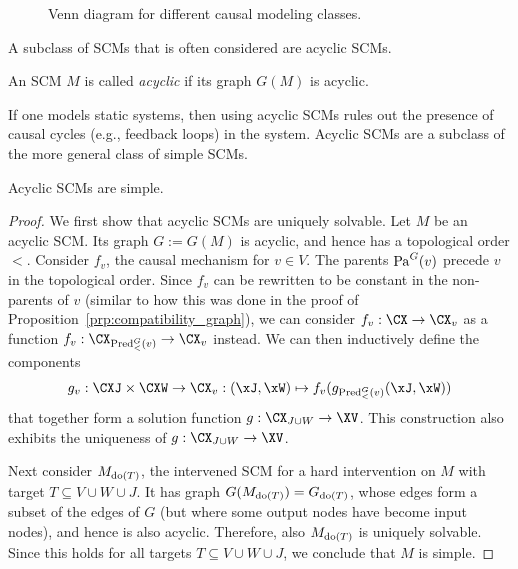 \begin{figure}[t]\centering
  \caption{Venn diagram for different causal modeling classes.\label{fig:venn_diagram_scms}}
\end{figure}
A subclass of SCMs that is often considered are acyclic SCMs.
\begin{Def}\label{def:scm_acyclic}
  An SCM $M$ is called \emph{acyclic} if its graph $G(M)$ is acyclic.
\end{Def}
If one models static systems, then using acyclic SCMs
rules out the presence of causal cycles (e.g., feedback loops) in the system.
Acyclic SCMs are a subclass of the more general class of simple SCMs.
\begin{Prp}\label{prp:acyclic_scms_are_simple}
  Acyclic SCMs are simple.
\end{Prp}
\begin{proof}
  We first show that acyclic SCMs are uniquely solvable. Let $M$ be an acyclic SCM. Its
  graph $G := G(M)$ is acyclic, and hence has a topological order $<$. Consider $f_v$, the
  causal mechanism for $v \in V$. The parents $\mathrm{Pa}^G(v)$ precede $v$ in the topological order.
  Since $f_v$ can be rewritten to be constant in the non-parents of $v$ (similar to how this
  was done in the proof of Proposition~\ref{prp:compatibility_graph}), 
  we can consider $f_v : \CX \to \CX_v$ as a function
  $f_v : \CX_{\Pred_<^{G}(v)} \to \CX_v$ instead. We can then inductively define the components
  $$g_v : \CXJ \times \CXW \to \CX_v : 
    (\xJ,\xW) \mapsto f_v(g_{\Pred_<^{G}(v)}(\xJ,\xW))$$
  that together form a solution function $g : \CX_{J\cup W} \to \XV$.
  This construction also exhibits the uniqueness of $g : \CX_{J\cup W} \to \XV$.

  Next consider $M_{\operatorname{do}(T)}$, the intervened SCM for a hard intervention on $M$ with target $T \subseteq V \cup W \cup J$. 
  It has graph $G(M_{\operatorname{do}(T)}) = G_{\operatorname{do}(T)}$, whose edges form a subset of the edges of $G$ (but
  where some output nodes have become input nodes), and hence is also acyclic. 
  Therefore, also $M_{\operatorname{do}(T)}$ is uniquely solvable. Since this holds for all targets $T \subseteq V \cup W \cup J$,
  we conclude that $M$ is simple.
\end{proof}

